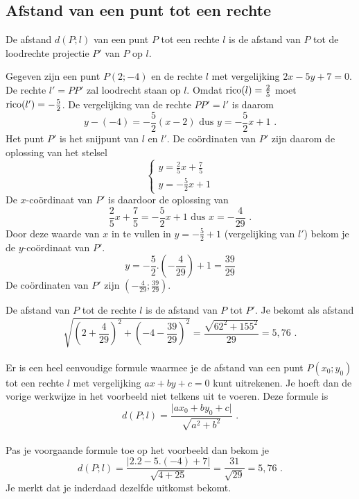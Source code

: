 \subsection{Afstand van een punt tot een rechte}
\noindent

De afstand $d(P;l)$ van een punt $P$ tot een rechte $l$ is de afstand van $P$ tot de loodrechte projectie $P'$ van $P$ op $l$.\\

\begin{voorbeeld}
	Gegeven zijn een punt $P(2;-4)$ en de rechte $l$ met vergelijking $2x-5y+7=0$.
De rechte $l'=PP'$ zal loodrecht staan op $l$.
Omdat $\operatorname{rico} (l)=\frac {2}{5}$ moet $\operatorname{rico} (l')=-\frac {5}{2}$.
De vergelijking van de rechte $PP'=l'$ is daarom
\[
y-(-4)=-\frac {5}{2} (x-2) \text { dus } y=-\frac {5}{2}x+1 \text { .}
\]
Het punt $P'$ is het snijpunt van $l$ en $l'$.
De co\"ordinaten van $P'$ zijn daarom de oplossing van het stelsel
\[
\begin{cases}
y=\frac {2}{5} x +\frac {7}{5} \\
y=-\frac {5}{2} x +1
\end{cases}
\] 
De $x$-co\"ordinaat van $P'$ is daardoor de oplossing van
\[
\frac {2}{5} x+\frac {7}{5} = -\frac {5}{2} x +1 \text { dus } x=-\frac {4}{29} \text { .}
\]
Door deze waarde van $x$ in te vullen in $y=-\frac {5}{2}+1$ (vergelijking van $l'$) bekom je de $y$-co\"ordinaat van $P'$.
\[
y=-\frac {5}{2}.(-\frac{4}{29})+1=\frac {39}{29}
\]
De co\"ordinaten van $P'$ zijn $(-\frac {4}{29}; \frac {39}{29 })$.

De afstand van $P$ tot de rechte $l$ is de afstand van $P$ tot $P'$.
Je bekomt als afstand
\[
\sqrt { \left( 2+\frac {4}{29}  \right)^2 + \left( -4-\frac {39}{29}  \right)^2  } =\frac {\sqrt { 62^2+155^2}}{29}=5,76 \text { .}
\]\\

Er is een heel eenvoudige formule waarmee je de afstand van een punt $P(x_0;y_0)$ tot een rechte $l$ met vergelijking $ax+by+c=0$ kunt uitrekenen.
Je hoeft dan de vorige werkwijze in het voorbeeld niet telkens uit te voeren.
Deze formule is
\[
d(P;l)=\frac { \vert ax_0+by_0+c \vert }{\sqrt {a^2+b^2}} \text { .}
\]\\

Pas je voorgaande formule toe op het voorbeeld dan bekom je
\[
d(P;l)=\frac { \vert 2.2-5.(-4)+7 \vert }{\sqrt {4+25}}=\frac {31}{\sqrt {29}}=5,76 \text { .}
\]
Je merkt dat je inderdaad dezelfde uitkomst bekomt.\\
\end{voorbeeld}


